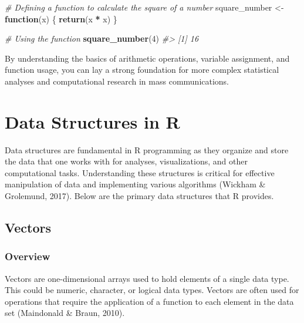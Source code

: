 \documentclass[
]{book}
\newenvironment{Shaded}{\begin{snugshade}}{\end{snugshade}}
\newcommand{\CommentTok}[1]{\textcolor[rgb]{0.56,0.35,0.01}{\textit{#1}}}
\newcommand{\ControlFlowTok}[1]{\textcolor[rgb]{0.13,0.29,0.53}{\textbf{#1}}}
\newcommand{\DecValTok}[1]{\textcolor[rgb]{0.00,0.00,0.81}{#1}}
\newcommand{\FunctionTok}[1]{\textcolor[rgb]{0.13,0.29,0.53}{\textbf{#1}}}
\newcommand{\NormalTok}[1]{#1}
\newcommand{\OtherTok}[1]{\textcolor[rgb]{0.56,0.35,0.01}{#1}}
\newcommand{\SpecialCharTok}[1]{\textcolor[rgb]{0.81,0.36,0.00}{\textbf{#1}}}
\begin{document}
\begin{Shaded}
\begin{Highlighting}[]
\CommentTok{\# Defining a function to calculate the square of a number}
\NormalTok{square\_number }\OtherTok{\textless{}{-}} \ControlFlowTok{function}\NormalTok{(x) \{}
  \FunctionTok{return}\NormalTok{(x }\SpecialCharTok{*}\NormalTok{ x)}
\NormalTok{\}}

\CommentTok{\# Using the function}
\FunctionTok{square\_number}\NormalTok{(}\DecValTok{4}\NormalTok{)}
\CommentTok{\#\textgreater{} [1] 16}
\end{Highlighting}
\end{Shaded}

By understanding the basics of arithmetic operations, variable assignment, and function usage, you can lay a strong foundation for more complex statistical analyses and computational research in mass communications.

\hypertarget{data-structures-in-r}{%
\section{Data Structures in R}\label{data-structures-in-r}}

Data structures are fundamental in R programming as they organize and store the data that one works with for analyses, visualizations, and other computational tasks. Understanding these structures is critical for effective manipulation of data and implementing various algorithms (Wickham \& Grolemund, 2017). Below are the primary data structures that R provides.

\hypertarget{vectors}{%
\subsection*{Vectors}\label{vectors}}

\hypertarget{overview-2}{%
\subsubsection*{Overview}\label{overview-2}}

Vectors are one-dimensional arrays used to hold elements of a single data type. This could be numeric, character, or logical data types. Vectors are often used for operations that require the application of a function to each element in the data set (Maindonald \& Braun, 2010).
\end{document}
